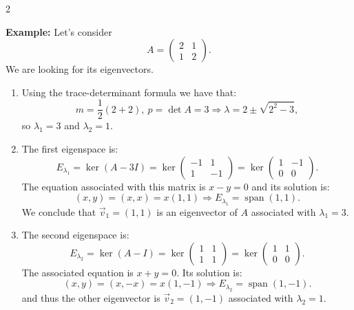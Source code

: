 \documentclass[12pt]{article}
\newcommand{\twobytwo}[4]{\begin{pmatrix} %
    #1 & #2 \\ #3 & #4 \end{pmatrix}}
\newcommand{\To}{\Rightarrow}
\begin{document}
\begin{multicols}{2}

\textbf{Example:}
  Let's consider 
  \[A=\twobytwo{2}{1}{1}{2}.\] 
  We are looking for its eigenvectors.
  \begin{enumerate}
    \item Using the trace-determinant formula we have that: 
    \[m=\frac{1}{2}(2+2),\ p=\det A=3\To \lambda=2\pm\sqrt{2^2-3},\]
    so \(\lambda_1=3\) and \(\lambda_2=1\).
    
    \item The first eigenspace is: 
    \[E_{\lambda_1}=\ker(A-3I)=\ker\twobytwo{-1}{1}{1}{-1}=\ker\twobytwo{1}{-1}{0}{0}.\]
    The equation associated with this matrix is \(x-y=0\) and its solution is: 
    \[(x,y)=(x,x)=x(1,1)\To E_{\lambda_1}=\operatorname{span}(1,1).\]
    We conclude that \(\vec{v}_1=(1,1)\) is an eigenvector of \(A\) associated with \(\lambda_1=3\).
    
    \item The second eigenspace is: 
    \[E_{\lambda_2}=\ker(A-I)=\ker\twobytwo{1}{1}{1}{1}=\ker\twobytwo{1}{1}{0}{0}.\]
    The associated equation is \(x+y=0\). Its solution is: 
    \[(x,y)=(x,-x)=x(1,-1)\To E_{\lambda_2}=\operatorname{span}(1,-1).\]
    and thus the other eigenvector is \(\vec{v}_2=(1,-1)\) associated with \(\lambda_2=1\).
  \end{enumerate}
 

\end{multicols}
\end{document}
